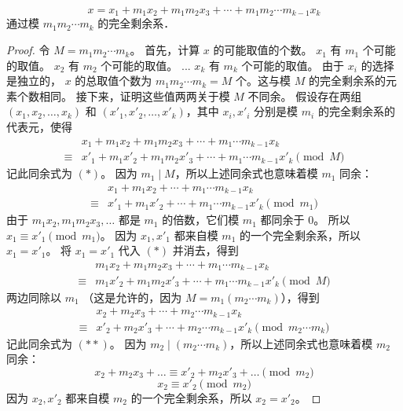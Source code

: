 \begin{enumerate}
    $$
    x = x_1+m_1 x_2+m_1 m_2 x_3+\cdots+m_1 m_2 \cdots m_{k-1} x_k
    $$
    通过模 $m_1 m_2 \cdots m_k$ 的完全剩余系．
    \begin{proof}
        令 $M = m_1 m_2 \cdots m_k$。
        首先，计算 $x$ 的可能取值的个数。
        $x_1$ 有 $m_1$ 个可能的取值。
        $x_2$ 有 $m_2$ 个可能的取值。
        ...
        $x_k$ 有 $m_k$ 个可能的取值。
        由于 $x_i$ 的选择是独立的， $x$ 的总取值个数为 $m_1 m_2 \cdots m_k = M$ 个。这与模 $M$ 的完全剩余系的元素个数相同。
        接下来，证明这些值两两关于模 $M$ 不同余。
        假设存在两组 $(x_1, x_2, \dots, x_k)$ 和 $(x'_1, x'_2, \dots, x'_k)$，其中 $x_i, x'_i$ 分别是模 $m_i$ 的完全剩余系的代表元，使得
        \begin{align*}
        &x_1+m_1 x_2+m_1 m_2 x_3+\cdots+m_1 \cdots m_{k-1} x_k \\
        \equiv &x'_1+m_1 x'_2+m_1 m_2 x'_3+\cdots+m_1 \cdots m_{k-1} x'_k \pmod M
        \end{align*}
        记此同余式为 $(*)$。
        因为 $m_1 \mid M$，所以上述同余式也意味着模 $m_1$ 同余：
        \begin{align*}
        &x_1+m_1 x_2+\cdots+m_1 \cdots m_{k-1} x_k \\
        \equiv &x'_1+m_1 x'_2+\cdots+m_1 \cdots m_{k-1} x'_k \pmod{m_1}
        \end{align*}
        由于 $m_1 x_2, m_1 m_2 x_3, \dots$ 都是 $m_1$ 的倍数，它们模 $m_1$ 都同余于 0。
        所以 $x_1 \equiv x'_1 \pmod{m_1}$。
        因为 $x_1, x'_1$ 都来自模 $m_1$ 的一个完全剩余系，所以 $x_1 = x'_1$。
        将 $x_1 = x'_1$ 代入 $(*)$ 并消去，得到
        \begin{align*}
        &m_1 x_2+m_1 m_2 x_3+\cdots+m_1 \cdots m_{k-1} x_k \\
        \equiv &m_1 x'_2+m_1 m_2 x'_3+\cdots+m_1 \cdots m_{k-1} x'_k \pmod M
        \end{align*}
        两边同除以 $m_1$ （这是允许的，因为 $M = m_1 (m_2 \cdots m_k)$），得到
        \begin{align*}
        &x_2+m_2 x_3+\cdots+m_2 \cdots m_{k-1} x_k \\
        \equiv &x'_2+m_2 x'_3+\cdots+m_2 \cdots m_{k-1} x'_k \pmod{m_2 \cdots m_k}
        \end{align*}
        记此同余式为 $(**)$。
        因为 $m_2 \mid (m_2 \cdots m_k)$，所以上述同余式也意味着模 $m_2$ 同余：
        \[ x_2 + m_2 x_3 + \dots \equiv x'_2 + m_2 x'_3 + \dots \pmod{m_2} \]
        \[ x_2 \equiv x'_2 \pmod{m_2} \]
        因为 $x_2, x'_2$ 都来自模 $m_2$ 的一个完全剩余系，所以 $x_2 = x'_2$。

\end{proof}
\end{enumerate}
